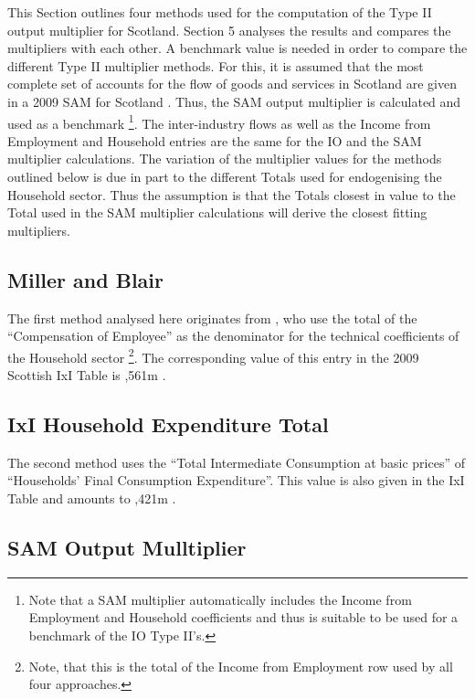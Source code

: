 \begin{doublespacing}
This Section outlines four methods used for the computation of the Type II output multiplier for Scotland. Section 5 analyses the results and compares the multipliers with each other. A benchmark value is needed in order to compare the different Type II multiplier methods. For this, it is assumed that the most complete set of accounts for the flow of goods and services in Scotland are given in a 2009 SAM for Scotland \cite{SCOSAM}. Thus, the SAM output multiplier is calculated and used as a benchmark \footnote{Note that a SAM multiplier automatically includes the Income from Employment and Household coefficients and thus is suitable to be used for a benchmark of the IO Type II's.}. The inter-industry flows as well as the Income from Employment and Household entries are the same for the IO and the SAM multiplier calculations. The variation of the multiplier values for the methods outlined below is due in part to the different Totals used for endogenising the Household sector. Thus the assumption is that the Totals closest in value to the Total used in the SAM multiplier calculations will derive the closest fitting multipliers.

\subsection{Miller and Blair}
\label{sec:4.4.1}

The first method analysed here originates from , who use the total of the ``Compensation of Employee'' as the denominator for the technical coefficients of the Household sector \footnote{ Note, that this is the total of the Income from Employment row used by all four approaches.}. The corresponding value of this entry in the 2009 Scottish IxI Table is ,561m \cite{ScottishGovernment2013a}.

\subsection{IxI Household Expenditure Total}
\label{sec:4.4.2}

The second method uses the ``Total Intermediate Consumption at basic prices'' of ``Households’ Final Consumption Expenditure''. This value is also given in the IxI Table and amounts to ,421m \cite{ScottishGovernment2013a}.

\subsection{SAM Output Mulltiplier}
\label{sec:4.4.3}


\end{doublespacing}

